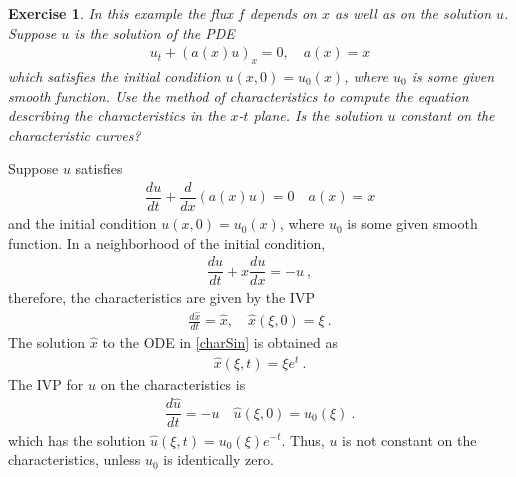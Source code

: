 \documentclass[10pt,letterpaper]{article}
\newcommand{\rb}[1]{ \left(  {#1} \right) }
\newcommand{\frb}[1]{ \left(  {#1} \right) }
\theoremstyle{break}
\newtheorem{exercise}{Exercise}
\begin{document}
\begin{exercise}
	In this example the flux $f$ depends on $x$ as well as on the solution $u$.
	Suppose $u$ is the solution of the PDE
	\begin{gather}%
		u_t +\rb{a(x)u}_x=0,
		\quad
		a(x)= x
	\end{gather}%
	which satisfies the initial condition $u(x,0)=u_0(x)$, where $u_0$ is some given smooth function.
	Use the method of characteristics to compute the equation describing the characteristics in the $x$-$t$ plane.
	Is the solution $u$ constant on the characteristic curves?
\end{exercise}

\begin{solution}
	Suppose $u$ satisfies
	\begin{gather}
		\dfrac{du}{dt}+\dfrac{d}{dx}\rb{a(x)u}=0
		\quad
		a(x)=x
	\end{gather}
	and the initial condition $u(x,0)=u_0(x)$, where $u_0$ is some given smooth function.
	In a neighborhood of the initial condition,
	\begin{gather}
		\dfrac{du}{dt}+x \dfrac{du}{dx}=-u\ ,
	\end{gather}
	therefore, the characteristics are given by the IVP
	\begin{gather} \label{charSin}
		\frac{d\hat{x}}{dt}
		=
		\hat{x},
		\quad
		\hat x\frb{\xi,0}=\xi\ .
	\end{gather}
	The solution $\hat x$ to the ODE in \eqref{charSin} is obtained as
	\begin{gather}
		\hat x\frb{\xi,t}=\xi e^t\ .
	\end{gather}
	The IVP for $u$ on the characteristics is
	\begin{gather}
		\dfrac{d\hat u}{dt}=-u
		\quad
		\hat u\frb{\xi,0}=u_0\frb{\xi}\ .
	\end{gather}
	which has the solution $\hat u(\xi,t) = u_0(\xi) e^{-t}$. Thus, $u$ is not constant on the characteristics, unless $u_0$ is identically zero.	
\end{solution}
\end{document}
